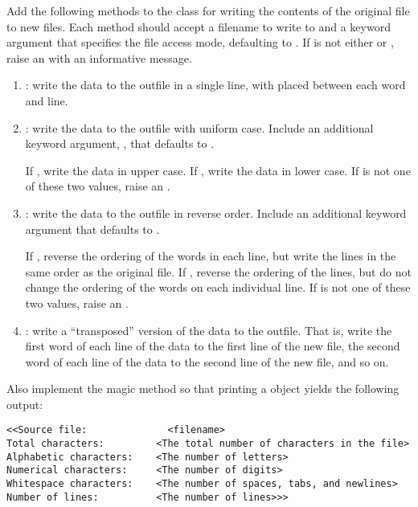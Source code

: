 \begin{problem} %
Add the following methods to the  class for writing the contents of the original file to new files.
Each method should accept a filename to write to and a keyword argument  that specifies the file access mode, defaulting to .
If  is not either  or , raise an  with an informative message.

\begin{enumerate}

\item {}: write the data to the outfile in a single line, with  placed between each word and line.

\item {}: write the data to the outfile with uniform case. Include an additional keyword argument, , that defaults to .

If , write the data in upper case. If , write the data in lower case. If  is not one of these two values, raise an .

\item {}: write the data to the outfile in reverse order. Include an additional keyword argument  that defaults to .

If , reverse the ordering of the words in each line, but write the lines in the same order as the original file. If , reverse the ordering of the lines, but do not change the ordering of the words on each individual line. If  is not one of these two values, raise an .

\item {}: write a ``transposed'' version of the data to the outfile. That is, write the first word of each line of the data to the first line of the new file, the second word of each line of the data to the second line of the new file, and so on.
\end{enumerate}

Also implement the  magic method so that printing a  object yields the following output:
\begin{lstlisting}
<<Source file:              <filename>
Total characters:         <The total number of characters in the file>
Alphabetic characters:    <The number of letters>
Numerical characters:     <The number of digits>
Whitespace characters:    <The number of spaces, tabs, and newlines>
Number of lines:          <The number of lines>>>
\end{lstlisting}
\end{problem}

